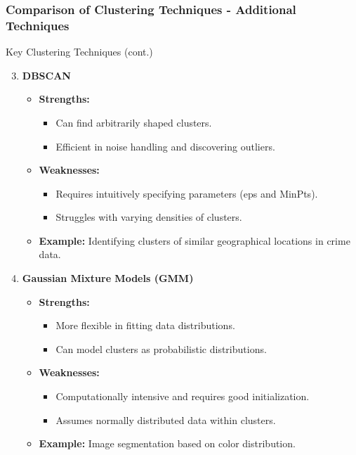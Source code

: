 \documentclass[aspectratio=169]{beamer}
\begin{document}
\begin{frame}[fragile]
    \frametitle{Comparison of Clustering Techniques - Additional Techniques}
    \begin{block}{Key Clustering Techniques (cont.)}
        \begin{enumerate}
            \setcounter{enumi}{2}  %
            \item \textbf{DBSCAN}
            \begin{itemize}
                \item \textbf{Strengths:}
                    \begin{itemize}
                        \item Can find arbitrarily shaped clusters.
                        \item Efficient in noise handling and discovering outliers.
                    \end{itemize}
                \item \textbf{Weaknesses:}
                    \begin{itemize}
                        \item Requires intuitively specifying parameters (eps and MinPts).
                        \item Struggles with varying densities of clusters.
                    \end{itemize}
                \item \textbf{Example:} Identifying clusters of similar geographical locations in crime data.
            \end{itemize}

            \item \textbf{Gaussian Mixture Models (GMM)}
            \begin{itemize}
                \item \textbf{Strengths:}
                    \begin{itemize}
                        \item More flexible in fitting data distributions.
                        \item Can model clusters as probabilistic distributions.
                    \end{itemize}
                \item \textbf{Weaknesses:}
                    \begin{itemize}
                        \item Computationally intensive and requires good initialization.
                        \item Assumes normally distributed data within clusters.
                    \end{itemize}
                \item \textbf{Example:} Image segmentation based on color distribution.
            \end{itemize}
        \end{enumerate}
    \end{block}
\end{frame}
\end{document}

